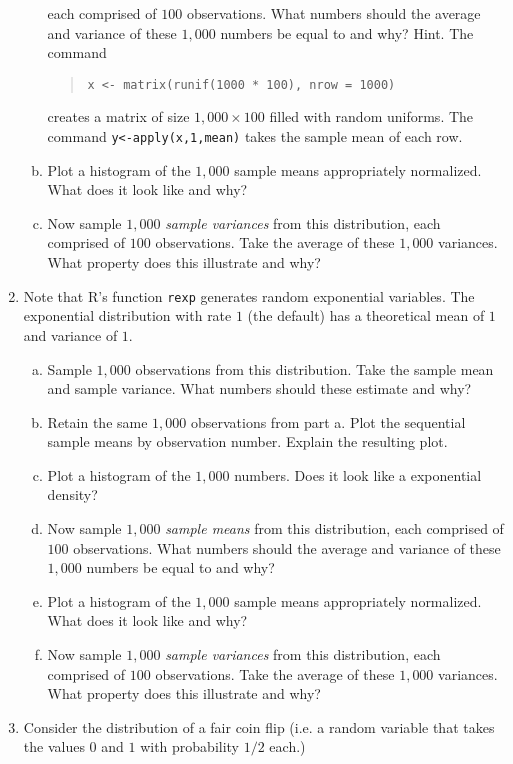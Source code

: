 \documentclass[12pt]{article}
\begin{document}
\begin{enumerate}[Problem 1.]
\begin{enumerate}[a.]
    each comprised of $100$ observations. What numbers should the
    average and variance of these $1,000$ numbers be equal to and why?
    Hint. The command
    \begin{quote}
      \texttt{x <- matrix(runif(1000 * 100), nrow = 1000)}
    \end{quote}
    creates a matrix of size $1,000\times 100$ filled with random
    uniforms. The command \texttt{y<-apply(x,1,mean)} takes the sample
    mean of each row.
  \item Plot a histogram of the $1,000$ sample means appropriately
    normalized. What does it look like and why?
  \item Now sample $1,000$ {\em sample variances} from this distribution,
    each comprised of $100$ observations. Take the average of these
    $1,000$ variances. What property does this illustrate and why?
  \end{enumerate}
\item Note that R's function \texttt{rexp} generates random
  exponential variables. The exponential distribution with rate $1$
  (the default) has a theoretical mean of $1$ and variance of $1$.
  \begin{enumerate}[a.]
  \item Sample $1,000$ observations from this distribution. Take the
    sample mean and sample variance. What numbers should these
    estimate and why?
  \item Retain the same $1,000$ observations from part a. Plot the
    sequential sample means by observation number. Explain the
    resulting plot.
  \item Plot a histogram of the $1,000$ numbers. Does it look like a
    exponential density?
  \item Now sample $1,000$ {\em sample means} from this distribution,
    each comprised of $100$ observations. What numbers should the
    average and variance of these $1,000$ numbers be equal to and why?
 \item Plot a histogram of the $1,000$ sample means appropriately
    normalized. What does it look like and why?
  \item Now sample $1,000$ {\em sample variances} from this distribution,
    each comprised of $100$ observations. Take the average of these
    $1,000$ variances. What property does this illustrate and why?
  \end{enumerate}
\item  Consider the distribution of a fair coin flip (i.e. a random variable
  that takes the values $0$ and $1$ with probability $1/2$ each.)

\end{enumerate}
\end{document}
